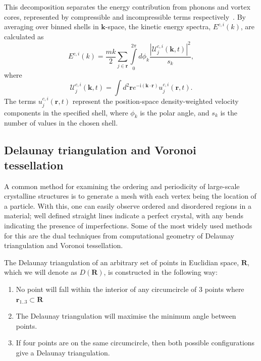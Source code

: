 This decomposition separates the energy contribution from phonons and vortex cores, represented by compressible and incompressible terms respectively~\cite{CT:Horng_pra_2009}. By averaging over binned shells in $\mathbf{k}$-space, the kinetic energy spectra, $E^{c,i}(k)$, are calculated as~\cite{CT:Bradley_prx_2012}
\begin{equation}\label{eqn:kin_spec_ic}
	E^{c,i}(k) = \frac{mk}{2}\sum\limits_{j\in\mathbf{r}} \int\limits_{0}^{2\pi}d\phi_k \frac{ |\mathcal{U}_j^{c,i}(\mathbf{k},t) |^2}{s_k},
\end{equation}
where
\begin{equation}
	\mathcal{U}_j^{c,i}(\mathbf{k},t) = \int d^2 \mathbf{r} e^{-\textrm{i}(\mathbf{k}\cdot\mathbf{r})} u_j^{c,i}(\mathbf{r},t).
\end{equation}
The terms $u_j^{c,i}(\mathbf{r},t)$ represent the position-space density-weighted velocity components in the specified shell, where $\phi_k$ is the polar angle, and $s_k$ is the number of values in the chosen shell.

\subsection{Delaunay triangulation and Voronoi tessellation}\label{sec:delaunay}
A common method for examining the ordering and periodicity of large-scale crystalline structures is to generate a mesh with each vertex being the location of a particle. With this, one can easily observe ordered and disordered regions in a material; well defined straight lines indicate a perfect crystal, with any bends indicating the presence of imperfections. Some of the most widely used methods for this are the dual techniques from computational geometry of Delaunay triangulation and Voronoi tessellation.

The Delaunay triangulation of an arbitrary set of points in Euclidian space, $\mathbf{R}$, which we will denote as $D(\mathbf{R})$, is constructed in the following way:
\begin{enumerate}
    \item No point will fall within the interior of any circumcircle of 3 points where $\mathbf{r}_{1..3} \subset \mathbf{R}$
    \item The Delaunay triangulation will maximise the minimum angle between points.
    \item If four points are on the same circumcircle, then both possible configurations give a Delaunay triangulation.
\end{enumerate}

